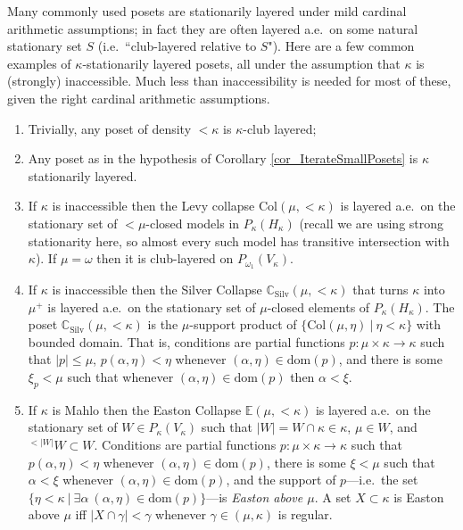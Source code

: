 \documentclass{amsart}
\begin{document}
Many commonly used posets are stationarily  layered under mild cardinal arithmetic assumptions; in fact they are often layered a.e.\ on some natural stationary set $S$ (i.e.\ ``club-layered relative to $S$").  Here are a few common examples of $\kappa$-stationarily layered posets, all under the assumption that $\kappa$ is (strongly) inaccessible.  Much less than inaccessibility is needed for most of these, given the right cardinal arithmetic assumptions. 
\begin{enumerate}
 \item Trivially, any poset of density $<\kappa$ is $\kappa$-club layered;
 \item Any poset as in the hypothesis of Corollary \ref{cor_IterateSmallPosets} is $\kappa$ stationarily layered. 
 \item If $\kappa$ is inaccessible then the Levy collapse $\text{Col}(\mu, < \kappa)$ is layered a.e.\ on the stationary set of $<\mu$-closed models in $P_\kappa(H_{\kappa})$ (recall we are using strong stationarity here, so almost every such model has transitive intersection with $\kappa$).  If $\mu = \omega$ then it is club-layered on $P_{\omega_1}(V_\kappa)$.
 \item If $\kappa$ is inaccessible then the Silver Collapse $\mathbb{C}_{\text{Silv}}(\mu, < \kappa)$ that turns $\kappa$ into $\mu^+$ is layered a.e.\ on the stationary set of $\mu$-closed elements of $P_\kappa(H_{\kappa})$.  The poset $\mathbb{C}_{\text{Silv}}(\mu, < \kappa)$ is the $\mu$-support product of $\{ \text{Col}(\mu,\eta) \ | \ \eta < \kappa \}$ with bounded domain.  That is, conditions are partial functions $p: \mu \times \kappa \to \kappa$ such that $|p| \le \mu$, $p(\alpha,\eta) < \eta$ whenever $(\alpha,\eta) \in \text{dom}(p)$, and there is some $\xi_p < \mu$ such that whenever $(\alpha,\eta) \in \text{dom}(p)$ then $\alpha < \xi$.
 \item\label{item_EastonCollapse} If $\kappa$ is Mahlo then the Easton Collapse $\mathbb{E}(\mu,<\kappa)$ is layered a.e.\ on the stationary set of $W \in P_\kappa(V_\kappa)$ such that $|W| = W \cap \kappa \in \kappa$, $\mu \in W$, and ${}^{<|W|} W \subset W$.  Conditions are partial functions $p: \mu \times \kappa \to \kappa$ such that $p(\alpha,\eta) < \eta$ whenever $(\alpha,\eta) \in \text{dom}(p)$, there is some $\xi < \mu$ such that $\alpha < \xi$ whenever $(\alpha, \eta) \in \text{dom}(p)$, and the support of $p$---i.e.\ the set $\{ \eta < \kappa \ | \ \exists \alpha \ (\alpha,\eta) \in \text{dom}(p) \}$---is \emph{Easton above $\mu$}.  A set $X \subset \kappa$ is Easton above $\mu$ iff $|X \cap \gamma|<\gamma$ whenever $\gamma \in (\mu,\kappa)$ is regular. 

\end{enumerate}
\end{document}

